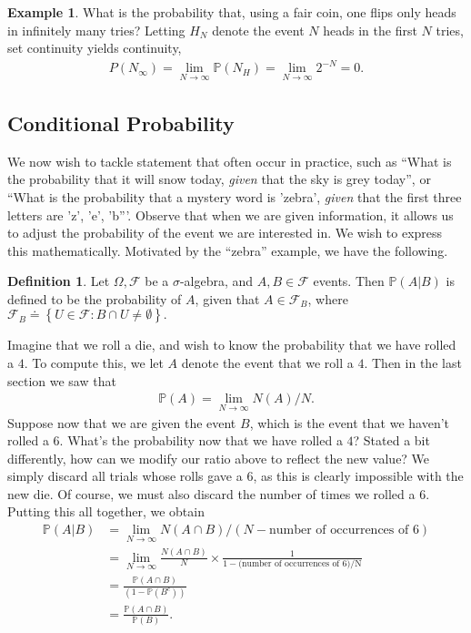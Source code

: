 \documentclass[12pt]{article}
\newcommand{\filter}{\mathcal{F}}
\newcommand{\prob}{\mathbb{P}}
\theoremstyle{plain}
\theoremstyle{definition}
\newtheorem*{definition}{Definition}
\newtheorem*{example}{Example}
\theoremstyle{remark}
\numberwithin{equation}{section}  %
\begin{document}
\begin{example}What is the probability that, using a fair coin, one
flips only heads in infinitely many tries? Letting $H_N$ denote the event
$N$ heads in the first $N$ tries, set continuity yields
continuity,
\begin{align*}
P(N_\infty) = \lim_{N \to \infty} \prob(N_H) = \lim_{N \to \infty} 2^{-N} = 0.
\end{align*}
\end{example}
\subsection{Conditional Probability}
We now wish to tackle statement that often occur in practice,
such as ``What is the probability that it will snow today, \emph{given}
that the sky is grey today'', or ``What is the probability that a mystery word
is 'zebra', \emph{given} that the first three letters are 'z', 'e', 'b'''.
Observe that when we are given information, it allows us to adjust the
probability of the event we are interested in. We wish to express this
mathematically. Motivated by the ``zebra'' example, we have the following.
\begin{definition}
Let $\Omega, \filter$ be a $\sigma$-algebra, and $A, B \in \filter$ events.
Then $\prob(A | B)$ is defined to be the probability of $A$, given that $A \in \filter_B$, where $\filter_B
\doteq \left\{ U \in \filter: B \cap U \neq \emptyset \right\}.$
\end{definition}
Imagine that we roll a die, and wish to know the probability that
we have rolled a $4$.
To compute this, we let $A$ denote the event that we roll a $4$. Then in the last section we saw
that
\begin{align*}
\prob(A) = \lim_{N \to \infty} N(A)/N.
\end{align*}
Suppose now that we are given the event $B$, which is the event that we haven't
rolled a $6$.
What's the probability now that we have rolled a $4$?
Stated a bit differently, how can we modify our ratio above to reflect the
new value? We simply discard all trials whose rolls gave a $6$, as this is clearly
impossible with the new die. Of course, we must also discard the number of times
we rolled a $6$. Putting this all together, we obtain
\begin{align*}
\prob(A | B) & = \lim_{N \to \infty} N(A \cap B)/(N -
\text{number of occurrences of $6$})
\\
& = \lim_{N \to \infty} \frac{N(A \cap B)}{N} \times \frac{1}{1 - (\text{number
of occurrences of $6$)/N}}
\\
& = \frac{\prob(A \cap B)}{(1 - \prob(B^c))}
\\
& = \frac{\prob(A \cap B)}{\prob(B)}.
\end{align*}
\end{document}
